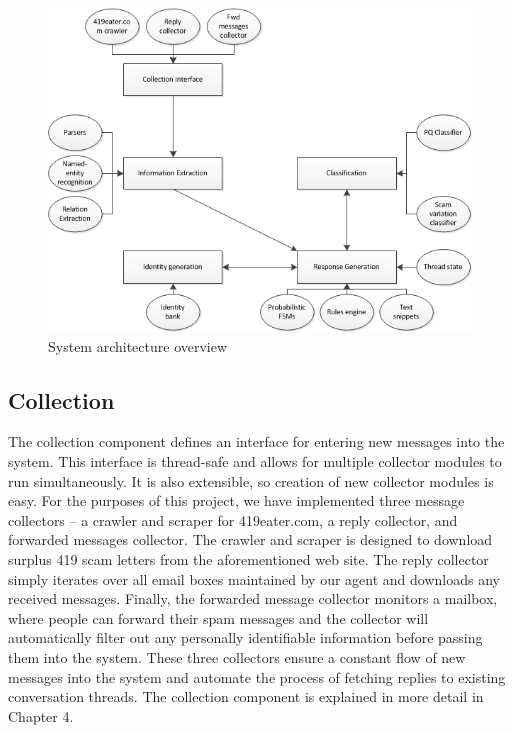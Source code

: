 \begin{figure}[h]
	\includegraphics{pics/system_smaller.png}
	\caption{System architecture overview}
\end{figure}


\subsection*{Collection}
The collection component defines an interface for entering new messages into the system. This interface is thread-safe and allows for multiple collector modules to run simultaneously. It is also extensible, so creation of new collector modules is easy. For the purposes of this project, we have implemented three message collectors -- a crawler and scraper for 419eater.com, a reply collector, and forwarded messages collector. The crawler and scraper is designed to download surplus 419 scam letters from the aforementioned web site. The reply collector simply iterates over all email boxes maintained by our agent and downloads any received messages. Finally, the forwarded message collector monitors a mailbox, where people can forward their spam messages and the collector will automatically filter out any personally identifiable information before passing them into the system. These three collectors ensure a constant flow of new messages into the system and automate the process of fetching replies to existing conversation threads. The collection component is explained in more detail in Chapter 4.

